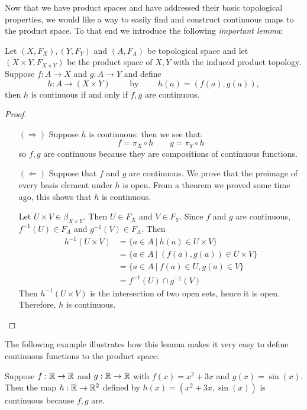 Now that we have product spaces and have addressed their basic topological properties, we would like a way to easily find and construct continuous maps to the product space. To that end we introduce the following \emph{important lemma}: 
\begin{lemma}
	Let $(X,F_X),(Y,F_Y)$ and $(A,F_A)$ be topological space and let $(X\times Y,F_{X\times Y})$ be the product space of $X,Y$ with the induced product topology. Suppose $f:A\to X$ and $g:A\to Y$ and define
	\[h:A\to(X\times Y) \qquad \text{ by } \qquad h(a) = (f(a),g(a)),\]
	then $h$ is continuous if and only if $f,g$ are continuous. 
\end{lemma}
\begin{proof}
	\begin{itemize}
		\item[$(\Rightarrow)$] Suppose $h$ is continuous: then we see that:
		\[f = \pi_X \circ h \qquad g = \pi_Y \circ h\]
		so $f,g$ are continuous because they are compositions of continuous functions. 
		\item[$(\Leftarrow)$] Suppose that $f$ and $g$ are continuous. We prove that the preimage of every basis element under $h$ is open. From a theorem we proved some time ago, this shows that $h$ is continuous.
		
		Let $U\times V\in \beta_{X\times Y}$. Then $U\in F_X$ and $V\in F_Y$. Since $f$ and $g$ are continuous, $f^{-1}(U)\in F_A$ and $g^{-1}(V)\in F_A$. Then 
		\begin{align*}
			h^{-1}(U\times V) &= \{a\in A\ |\ h(a)\in U\times V\}\\
			&= \{a\in A\ |\ (f(a), g(a))\in U\times V\}\\
			&= \{a\in A\ |\ f(a)\in U, g(a)\in V\}\\
			&= f^{-1}(U)\cap g^{-1}(V) 
		\end{align*}
		Then $h^{-1}(U\times V)$ is the intersection of two open sets, hence it is open. Therefore, $h$ is continuous. 
	\end{itemize}
\end{proof}

The following example illustrates how this lemma makes it very easy to define continuous functions to the product space: 
\begin{example}
	Suppose $f:\mathbb R\to\mathbb R$ and $g:\mathbb R\to\mathbb R$ with $f(x) = x^2+3x$ and $g(x) = \sin(x)$. Then the map $h:\mathbb R\to\mathbb R^2$ defined by $h(x) = (x^2+3x, \sin(x))$ is continuous because $f,g$ are. 
\end{example}

